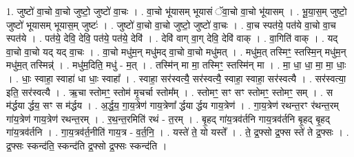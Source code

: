 \documentclass[17pt]{extarticle}
\begin{document}
1. जुष्टो॑ वा॒चो वा॒चो जुष्टो॒ जुष्टो॑ वा॒चः । . वा॒चो भू॑यासम् भूयासं ॅवा॒चो वा॒चो भू॑यासम् । . भू॒या॒स॒म् जुष्टो॒ जुष्टो॑ भूयासम् भूयास॒म् जुष्टः॑ । . जुष्टो॑ वा॒चो वा॒चो जुष्टो॒ जुष्टो॑ वा॒चः । . वा॒च स्पत॑ये॒ पत॑ये वा॒चो वा॒च स्पत॑ये । . पत॑ये॒ देवि॒ देवि॒ पत॑ये॒ पत॑ये॒ देवि॑ । . देवि॑ वाग् वा॒ग् देवि॒ देवि॑ वाक् । . वा॒गिति॑ वाक् । . यद् वा॒चो वा॒चो यद् यद् वा॒चः । . वा॒चो मधु॑म॒न् मधु॑मद् वा॒चो वा॒चो मधु॑मत् । . मधु॑म॒त् तस्मिꣳ॒॒ स्तस्मि॒न् मधु॑म॒न् मधु॑म॒त् तस्मिन्न्॑ । . मधु॑म॒दिति॒ मधु॑ - म॒त् । . तस्मि॑न् मा मा॒ तस्मिꣳ॒॒ स्तस्मि॑न् मा । . मा॒ धा॒ धा॒ मा॒ मा॒ धाः॒ । . धाः॒ स्वाहा॒ स्वाहा॑ धा धाः॒ स्वाहा᳚ । . स्वाहा॒ सर॑स्वत्यै॒ सर॑स्वत्यै॒ स्वाहा॒ स्वाहा॒ सर॑स्वत्यै । . सर॑स्वत्या॒ इति॒ सर॑स्वत्यै । . ऋ॒चा स्तोमꣳ॒॒ स्तोम॑ मृ॒चर्चा स्तोम᳚म् । . स्तोमꣳ॒॒ सꣳ सꣳ स्तोमꣳ॒॒ स्तोमꣳ॒॒ सम् । . स म॑र्द्धया र्द्धय॒ सꣳ स म॑र्द्धय । . अ॒र्द्ध॒य॒ गा॒य॒त्रेण॑ गाय॒त्रेणा᳚ र्द्धया र्द्धय गाय॒त्रेण॑ । . गा॒य॒त्रेण॑ रथन्त॒रꣳ र॑थन्त॒रम् गा॑य॒त्रेण॑ गाय॒त्रेण॑ रथन्त॒रम् । . र॒थ॒न्त॒रमिति॑ रथं - त॒रम् । . बृ॒हद् गा॑य॒त्रव॑र्तनि गाय॒त्रव॑र्तनि बृ॒हद् बृ॒हद् गा॑य॒त्रव॑र्तनि । . गा॒य॒त्रव॑र्त॒नीति॑ गाय॒त्र - व॒र्त॒नि॒ । . यस्ते॑ ते॒ यो यस्ते᳚ । . ते॒ द्र॒फ्सो द्र॒फ्स स्ते॑ ते द्र॒फ्सः । . द्र॒फ्सः स्कन्द॑ति॒ स्कन्द॑ति द्र॒फ्सो द्र॒फ्सः स्कन्द॑ति । \newline
\end{document}
